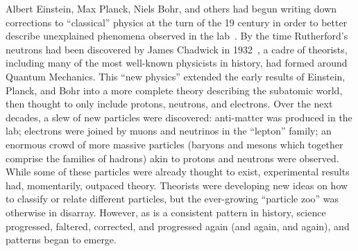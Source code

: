 \begin{dissertationintroduction}
Albert Einstein, Max Planck, Niels Bohr, and others had begun writing down corrections to ``classical'' physics at the turn of the 19 century in order to better describe unexplained phenomena observed in the lab~\cite{EinsteinPhotoelectric, Planck, Bohr}. 
By the time Rutherford's neutrons had been discovered by James Chadwick in 1932~\cite{Chadwick1932}, a cadre of theorists, including many of the most well-known physicists in history\footnotemark{}, had formed around Quantum Mechanics.
This ``new physics'' extended the early results of Einstein, Planck, and Bohr into a more complete theory describing the subatomic world, then thought to only include protons, neutrons, and electrons. 
Over the next decades, a slew of new particles were discovered: 
anti-matter was produced in the lab; 
electrons were joined by muons and neutrinos in the ``lepton'' family; 
an enormous crowd of more massive particles (baryons and mesons which together comprise the families of hadrons) akin to protons and neutrons were observed. 
While some of these particles were already thought to exist, experimental results had, momentarily, outpaced theory. 
Theorists were developing new ideas on how to classify or relate different particles, but the ever-growing ``particle zoo'' was otherwise in disarray. 
However, as is a consistent pattern in history, science progressed, faltered, corrected, and progressed again (and again, and again), and patterns began to emerge. 


\end{dissertationintroduction}
